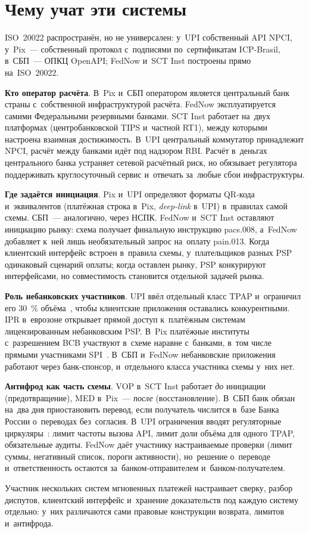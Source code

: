 \section{Чему учат эти системы}\label{sec:instant-lessons}

ISO~20022 распространён, но не универсален: у~UPI собственный API NPCI,
у~Pix~--- собственный протокол с~подписями по~сертификатам ICP-Brasil, в~СБП~---
ОПКЦ OpenAPI; FedNow и~SCT Inst построены прямо на~ISO~20022.

\textbf{Кто оператор расчёта}. В~Pix и~СБП оператором является центральный банк
страны с~собственной инфраструктурой расчёта. FedNow эксплуатируется самими
Федеральными резервными банками. SCT Inst работает на~двух платформах
(центробанковской TIPS и~частной RT1), между которыми настроена взаимная
достижимость. В~UPI центральный коммутатор принадлежит NPCI, расчёт между
банками идёт под надзором RBI. Расчёт в~деньгах центрального банка устраняет
сетевой расчётный риск, но обязывает регулятора поддерживать круглосуточный
сервис и~отвечать за~любые сбои инфраструктуры.

\textbf{Где задаётся инициация}. Pix и~UPI определяют форматы QR-кода
и~эквивалентов (платёжная строка в~Pix, \textit{deep-link} в~UPI) в~правилах
самой схемы. СБП~--- аналогично, через НСПК. FedNow и~SCT Inst оставляют
инициацию рынку: схема получает финальную инструкцию pacs.008, а~FedNow
добавляет к~ней лишь необязательный запрос на~оплату pain.013. Когда
клиентский интерфейс встроен в~правила схемы, у~плательщиков разных PSP
одинаковый сценарий оплаты; когда оставлен рынку, PSP конкурируют интерфейсами,
но совместимость становится отдельной задачей рынка.

\textbf{Роль небанковских участников}. UPI ввёл отдельный класс TPAP и~ограничил его
30~\% объёма~\cite{npci-upi-tpap-cap}, чтобы клиентские приложения оставались
конкурентными. IPR в~еврозоне открывает прямой доступ к~платёжным системам
лицензированным небанковским PSP. В~Pix платёжные институты с~разрешением BCB
участвуют в~схеме наравне с~банками, в~том числе прямыми участниками
SPI~\cite{pix-resolution-bcb-1}. В~СБП и~FedNow небанковские приложения
работают через банк-спонсор, и~отдельного класса участника схемы у~них нет.

\textbf{Антифрод как часть схемы}. VOP в~SCT Inst работает \emph{до} инициации
(предотвращение), MED в~Pix~--- \emph{после} (восстановление). В~СБП банк обязан
на~два дня приостановить перевод, если получатель числится в~базе Банка России
о~переводах без~согласия. В~UPI ограничения вводят регуляторные
циркуляры~\cite{npci-upi-oc-215}: лимит частоты вызова API, лимит доли объёма
для одного TPAP, обязательные аудиты. FedNow даёт участнику настраиваемые
проверки (лимит суммы, негативный список, пороги активности), но~решение
о~переводе и~ответственность остаются за~банком-отправителем
и~банком-получателем.

Участник нескольких систем мгновенных платежей настраивает сверку, разбор
диспутов, клиентский интерфейс и~хранение доказательств под каждую систему
отдельно: у~них различаются сами правовые конструкции возврата, лимитов
и~антифрода.
